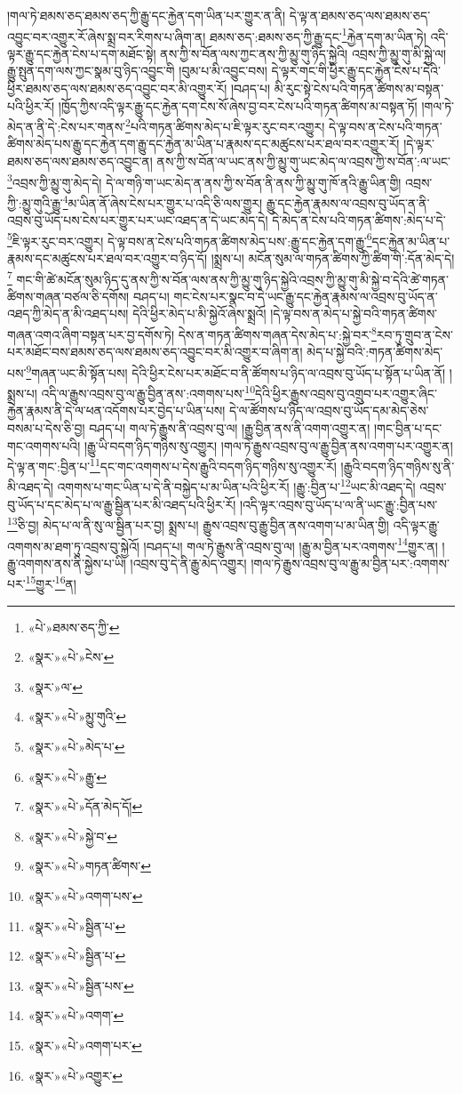 །གལ་ཏེ་ཐམས་ཅད་ཐམས་ཅད་ཀྱི་རྒྱུ་དང་རྐྱེན་དག་ཡིན་པར་གྱུར་ན་ནི། དེ་ལྟ་ན་ཐམས་ཅད་ལས་ཐམས་ཅད་འབྱུང་བར་འགྱུར་རོ་ཞེས་སྨྲ་བར་རིགས་པ་ཞིག་ན། ཐམས་ཅད་:ཐམས་ཅད་ཀྱི་རྒྱུ་དང་\footnote{«པེ་»ཐམས་ཅད་ཀྱི་}རྐྱེན་དག་མ་ཡིན་ཏེ། འདི་ལྟར་རྒྱུ་དང་རྐྱེན་ངེས་པ་དག་མཐོང་སྟེ། ནས་ཀྱི་ས་བོན་ལས་ཀྱང་ནས་ཀྱི་མྱུ་གུ་ཉིད་སྐྱེའི། འབྲས་ཀྱི་མྱུ་གུ་མི་སྐྱེ་ལ། རྒྱུ་སྤུན་དག་ལས་ཀྱང་སྣམ་བུ་ཉིད་འབྱུང་གི །བུམ་པ་མི་འབྱུང་བས། དེ་ལྟར་གང་གི་ཕྱིར་རྒྱུ་དང་རྐྱེན་ངེས་པ་དེའི་ཕྱིར་ཐམས་ཅད་ལས་ཐམས་ཅད་འབྱུང་བར་མི་འགྱུར་རོ། །བཤད་པ། མི་རུང་སྟེ་ངེས་པའི་གཏན་ཚིགས་མ་བསྟན་པའི་ཕྱིར་རོ། །ཁྱོད་ཀྱིས་འདི་ལྟར་རྒྱུ་དང་རྐྱེན་དག་ངེས་སོ་ཞེས་བྱ་བར་ངེས་པའི་གཏན་ཚིགས་མ་བསྟན་ཏོ། །གལ་ཏེ་མེད་ན་ནི་དེ་:ངེས་པར་གནས་\footnote{«སྣར་»«པེ་»ངེས་}པའི་གཏན་ཚིགས་མེད་པ་ཇི་ལྟར་རུང་བར་འགྱུར། དེ་ལྟ་བས་ན་ངེས་པའི་གཏན་ཚིགས་མེད་པས་རྒྱུ་དང་རྐྱེན་དག་རྒྱུ་དང་རྐྱེན་མ་ཡིན་པ་རྣམས་དང་མཚུངས་པར་ཐལ་བར་འགྱུར་རོ། །དེ་ལྟར་ཐམས་ཅད་ལས་ཐམས་ཅད་འབྱུང་ན། ནས་ཀྱི་ས་བོན་ལ་ཡང་ནས་ཀྱི་མྱུ་གུ་ཡང་མེད་ལ་འབྲས་ཀྱི་ས་བོན་:ལ་ཡང་\footnote{«སྣར་»ལ་}འབྲས་ཀྱི་མྱུ་གུ་མེད་དེ། དེ་ལ་གཉི་ག་ཡང་མེད་ན་ནས་ཀྱི་ས་བོན་ནི་ནས་ཀྱི་མྱུ་གུ་ཁོ་ནའི་རྒྱུ་ཡིན་གྱི། འབྲས་ཀྱི་:མྱུ་གུའི་རྒྱུ་\footnote{«སྣར་»«པེ་»མྱུ་གུའི་}མ་ཡིན་ནོ་ཞེས་ངེས་པར་གྱུར་པ་འདི་ཅི་ལས་གྱུར། རྒྱུ་དང་རྐྱེན་རྣམས་ལ་འབྲས་བུ་ཡོད་ན་ནི་འབྲས་བུ་ཡོད་པས་ངེས་པར་གྱུར་པར་ཡང་འཐད་ན་དེ་ཡང་མེད་དེ། དེ་མེད་ན་ངེས་པའི་གཏན་ཚིགས་:མེད་པ་དེ་\footnote{«སྣར་»«པེ་»མེད་པ་}ཇི་ལྟར་རུང་བར་འགྱུར། དེ་ལྟ་བས་ན་ངེས་པའི་གཏན་ཚིགས་མེད་པས་:རྒྱུ་དང་རྐྱེན་དག་རྒྱུ་\footnote{«སྣར་»«པེ་»རྒྱུ་}དང་རྐྱེན་མ་ཡིན་པ་རྣམས་དང་མཚུངས་པར་ཐལ་བར་འགྱུར་བ་ཉིད་དོ། །སྨྲས་པ། མངོན་སུམ་ལ་གཏན་ཚིགས་ཀྱི་ཚིག་གི་:དོན་མེད་དེ།\footnote{«སྣར་»«པེ་»དོན་མེད་དོ།} གང་གི་ཚེ་མངོན་སུམ་ཉིད་དུ་ནས་ཀྱི་ས་བོན་ལས་ནས་ཀྱི་མྱུ་གུ་ཉིད་སྐྱེའི་འབྲས་ཀྱི་མྱུ་གུ་མི་སྐྱེ་བ་དེའི་ཚེ་གཏན་ཚིགས་གཞན་བཙལ་ཅི་དགོས། བཤད་པ། གང་ངེས་པར་སྣང་བ་དེ་ཡང་རྒྱུ་དང་རྐྱེན་རྣམས་ལ་འབྲས་བུ་ཡོད་ན་འཐད་ཀྱི་མེད་ན་མི་འཐད་པས། དེའི་ཕྱིར་མེད་པ་མི་སྐྱེའོ་ཞེས་སྨྲའོ། །དེ་ལྟ་བས་ན་མེད་པ་སྐྱེ་བའི་གཏན་ཚིགས་གཞན་འགའ་ཞིག་བསྟན་པར་བྱ་དགོས་ཏེ། དེས་ན་གཏན་ཚིགས་གཞན་དེས་མེད་པ་:སྐྱེ་བར་\footnote{«སྣར་»«པེ་»སྐྱེ་བ་}རབ་ཏུ་གྲུབ་ན་ངེས་པར་མཐོང་བས་ཐམས་ཅད་ལས་ཐམས་ཅད་འབྱུང་བར་མི་འགྱུར་བ་ཞིག་ན། མེད་པ་སྐྱེ་བའི་:གཏན་ཚིགས་མེད་པས་\footnote{«སྣར་»«པེ་»གཏན་ཚིགས་}གཞན་ཡང་མི་སྟོན་པས། དེའི་ཕྱིར་ངེས་པར་མཐོང་བ་ནི་ཚོགས་པ་ཉིད་ལ་འབྲས་བུ་ཡོད་པ་སྟོན་པ་ཡིན་ནོ། །སྨྲས་པ། འདི་ལ་རྒྱུས་འབྲས་བུ་ལ་རྒྱུ་བྱིན་ནས་:འགགས་པས་\footnote{«སྣར་»«པེ་»འགག་པས་}དེའི་ཕྱིར་རྒྱུས་འབྲས་བུ་འགྲུབ་པར་འགྱུར་ཞིང་རྐྱེན་རྣམས་ནི་དེ་ལ་ཕན་འདོགས་པར་བྱེད་པ་ཡིན་པས། དེ་ལ་ཚོགས་པ་ཉིད་ལ་འབྲས་བུ་ཡོད་དམ་མེད་ཅེས་བསམ་པ་དེས་ཅི་བྱ། བཤད་པ། གལ་ཏེ་རྒྱུས་ནི་འབྲས་བུ་ལ། །རྒྱུ་བྱིན་ནས་ནི་འགག་འགྱུར་ན། །གང་བྱིན་པ་དང་གང་འགགས་པའི། །རྒྱུ་ཡི་བདག་ཉིད་གཉིས་སུ་འགྱུར། །གལ་ཏེ་རྒྱུས་འབྲས་བུ་ལ་རྒྱུ་བྱིན་ནས་འགག་པར་འགྱུར་ན། དེ་ལྟ་ན་གང་:བྱིན་པ་\footnote{«སྣར་»«པེ་»སྦྱིན་པ་}དང་གང་འགགས་པ་དེས་རྒྱུའི་བདག་ཉིད་གཉིས་སུ་འགྱུར་རོ། །རྒྱུའི་བདག་ཉིད་གཉིས་སུ་ནི་མི་འཐད་དེ། འགགས་པ་གང་ཡིན་པ་དེ་ནི་བསྐྱེད་པ་མ་ཡིན་པའི་ཕྱིར་རོ། །རྒྱུ་:བྱིན་པ་\footnote{«སྣར་»«པེ་»སྦྱིན་པ་}ཡང་མི་འཐད་དེ། འབྲས་བུ་ཡོད་པ་དང་མེད་པ་ལ་རྒྱུ་སྦྱིན་པར་མི་འཐད་པའི་ཕྱིར་རོ། །འདི་ལྟར་འབྲས་བུ་ཡོད་པ་ལ་ནི་ཡང་རྒྱུ་:བྱིན་པས་\footnote{«སྣར་»«པེ་»སྦྱིན་པས་}ཅི་བྱ། མེད་པ་ལ་ནི་སུ་ལ་སྦྱིན་པར་བྱ། སྨྲས་པ། རྒྱུས་འབྲས་བུ་རྒྱུ་བྱིན་ནས་འགག་པ་མ་ཡིན་གྱི། འདི་ལྟར་རྒྱུ་འགགས་མ་ཐག་ཏུ་འབྲས་བུ་སྐྱེའོ། །བཤད་པ། གལ་ཏེ་རྒྱུས་ནི་འབྲས་བུ་ལ། །རྒྱུ་མ་བྱིན་པར་འགགས་\footnote{«སྣར་»«པེ་»འགག་}གྱུར་ན། །རྒྱུ་འགགས་ནས་ནི་སྐྱེས་པ་ཡི། །འབྲས་བུ་དེ་ནི་རྒྱུ་མེད་འགྱུར། །གལ་ཏེ་རྒྱུས་འབྲས་བུ་ལ་རྒྱུ་མ་བྱིན་པར་:འགགས་པར་\footnote{«སྣར་»«པེ་»འགག་པར་}གྱུར་\footnote{«སྣར་»«པེ་»འགྱུར་}ན། 